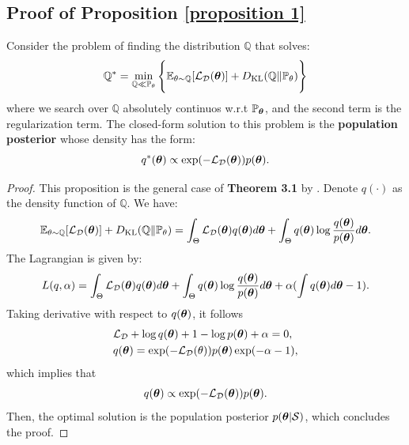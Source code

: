 \subsection{Proof of Proposition \ref{proposition 1}}
\label{proof: proposition 1}
\begin{proposition}
    Consider the problem of finding the distribution $\mathbb{Q}$ that solves:
    \begin{equation}
        \mathbb{Q}^* = \min_{\mathbb{Q} \ll \mathbb{P}_{\mathbf{\theta}}} \Bigg\{\mathbb{E}_{\theta \sim \mathbb{Q}}[\mathcal{L}_\mathcal{D}({\bm{\theta}})] + D_{\mathrm{KL}}(\mathbb{Q} \| \mathbb{P}_{\mathbf{\theta}}) \Bigg\}
    \end{equation}
    where we search over $\mathbb{Q}$ absolutely continuos w.r.t $\mathbb{P}_{\bm{\theta}}$, and the second term is the regularization term. The closed-form solution to this problem is the \textbf{population posterior} whose density has the form:
    \begin{equation*}
        q^*({\bm{\theta}}) \propto \exp(-\mathcal{L}_\mathcal{D}({\bm{\theta}}))p({\bm{\theta}}).
    \end{equation*}
\end{proposition}
\begin{proof}
    This proposition is the general case of \textbf{Theorem 3.1} by \cite{va2023_flat_Bayes}. Denote $q(\cdot)$ as the density function of $\mathbb{Q}$. We have: \begin{align*}
        \mathbb{E}_{\theta \sim \mathbb{Q}}[\mathcal{L}_\mathcal{D}({\bm{\theta}})] + D_{\mathrm{KL}}(\mathbb{Q} \| \mathbb{P}_{\mathbf{\theta}}) = \int_\Theta \mathcal{L}_\mathcal{D}({\bm{\theta}})q({\bm{\theta}}) d{\bm{\theta}} + \int_\Theta q({\bm{\theta}}) \log\frac{q({\bm{\theta}})}{p({\bm{\theta}})}d{\bm{\theta}}.
    \end{align*}
    The Lagrangian is given by:
    \begin{equation*}
        L(q, \alpha) = \int_\Theta \mathcal{L}_\mathcal{D}({\bm{\theta}})q({\bm{\theta}}) d{\bm{\theta}} + \int_\Theta q({\bm{\theta}}) \log\frac{q({\bm{\theta}})}{p({\bm{\theta}})}d{\bm{\theta}} + \alpha(\int q({\bm{\theta}})d{\bm{\theta}} - 1).
    \end{equation*}
    Taking derivative with respect to $q({\bm{\theta}})$, it follows
    \begin{align*}
        &\mathcal{L}_\mathcal{D} + \log q({\bm{\theta}}) + 1 - \log p({\bm{\theta}}) + \alpha = 0,\\
        &q({\bm{\theta}}) = \exp(-\mathcal{L}_\mathcal{D}(\theta))p({\bm{\theta}})\exp(-\alpha -1),\\
    \end{align*}
    which implies that
    \begin{equation*}
        q({\bm{\theta}}) \propto \exp(-\mathcal{L}_\mathcal{D}({\bm{\theta}}))p({\bm{\theta}}).
    \end{equation*}
    Then, the optimal solution is the population posterior $p({\bm{\theta}}|\mathcal{S})$, which concludes the proof.
\end{proof}
